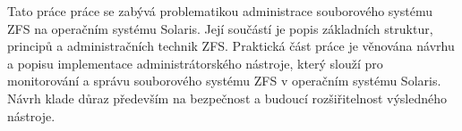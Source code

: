 Tato práce práce se zabývá problematikou administrace souborového systému ZFS na operačním systému Solaris. Její součástí je popis základních struktur, principů a administračních technik ZFS.
Praktická část práce je věnována návrhu a popisu implementace administrátorského nástroje, který slouží pro monitorování a správu souborového systému ZFS v operačním systému Solaris. Návrh klade důraz především na bezpečnost a budoucí rozšiřitelnost výsledného nástroje. 
